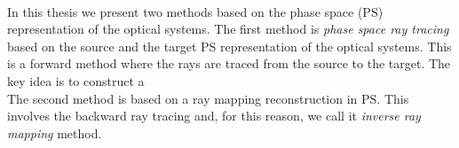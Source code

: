 \\ \indent 
In this thesis we present two methods based on the phase space (PS) representation of the optical systems. The first method is \textit{phase space ray tracing} based on the source and the target PS representation of the optical systems. This is a forward method where the rays are traced from the source to the target. The key idea is to construct a 
\\ \indent
The second method is based on a ray mapping reconstruction in PS. This involves the backward ray tracing and, for this reason, we call it \textit{inverse ray mapping} method.

